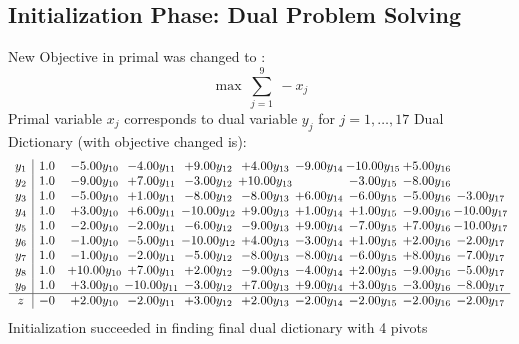\documentclass[9pt]{article}
\begin{document}
\subsection{Initialization Phase: Dual Problem Solving}
New Objective in primal was changed to : \[ \max\ \sum_{j=1}^{9}\ - x_j \] 
Primal variable $x_j$ corresponds to dual variable $y_j$ for $j = 1,\ldots,17$
Dual Dictionary (with objective changed is): 
\[\begin{array}{c| c c@{\hskip 2pt} c@{\hskip 2pt} c@{\hskip 2pt} c@{\hskip 2pt} c@{\hskip 2pt} c@{\hskip 2pt} c@{\hskip 2pt} c@{\hskip 2pt} }
 y_{1}   &  1.0 & -5.00 y_{10} & -4.00 y_{11} & +  9.00 y_{12} & +  4.00 y_{13} & -9.00 y_{14} & -10.00 y_{15} & +  5.00 y_{16} &   \\
 y_{2}   &  1.0 & -9.00 y_{10} & +  7.00 y_{11} & -3.00 y_{12} & + 10.00 y_{13} &   & -3.00 y_{15} & -8.00 y_{16} &   \\
 y_{3}   &  1.0 & -5.00 y_{10} & +  1.00 y_{11} & -8.00 y_{12} & -8.00 y_{13} & +  6.00 y_{14} & -6.00 y_{15} & -5.00 y_{16} & -3.00 y_{17}\\
 y_{4}   &  1.0 & +  3.00 y_{10} & +  6.00 y_{11} & -10.00 y_{12} & +  9.00 y_{13} & +  1.00 y_{14} & +  1.00 y_{15} & -9.00 y_{16} & -10.00 y_{17}\\
 y_{5}   &  1.0 & -2.00 y_{10} & -2.00 y_{11} & -6.00 y_{12} & -9.00 y_{13} & +  9.00 y_{14} & -7.00 y_{15} & +  7.00 y_{16} & -10.00 y_{17}\\
 y_{6}   &  1.0 & -1.00 y_{10} & -5.00 y_{11} & -10.00 y_{12} & +  4.00 y_{13} & -3.00 y_{14} & +  1.00 y_{15} & +  2.00 y_{16} & -2.00 y_{17}\\
 y_{7}   &  1.0 & -1.00 y_{10} & -2.00 y_{11} & -5.00 y_{12} & -8.00 y_{13} & -8.00 y_{14} & -6.00 y_{15} & +  8.00 y_{16} & -7.00 y_{17}\\
 y_{8}   &  1.0 & + 10.00 y_{10} & +  7.00 y_{11} & +  2.00 y_{12} & -9.00 y_{13} & -4.00 y_{14} & +  2.00 y_{15} & -9.00 y_{16} & -5.00 y_{17}\\
 y_{9}   &  1.0 & +  3.00 y_{10} & -10.00 y_{11} & -3.00 y_{12} & +  7.00 y_{13} & +  9.00 y_{14} & +  3.00 y_{15} & -3.00 y_{16} & -8.00 y_{17}\\
\hline
z    &  -0 & +  2.00 y_{10} & -2.00 y_{11} & +  3.00 y_{12} & +  2.00 y_{13} & -2.00 y_{14} & -2.00 y_{15} & -2.00 y_{16} & -2.00 y_{17}\\
\end{array}\]
Initialization succeeded in finding final dual dictionary with 4 pivots
\end{document}
